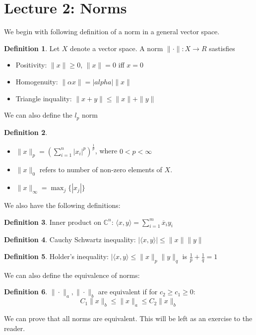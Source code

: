 \documentclass[11pt]{article}
\theoremstyle{definition}
\newtheorem{definition}{Definition}[section]
\newcommand{\C}{\mathbb{C}}
\begin{document}
\section{Lecture 2: Norms}
We begin with following definition of a norm in a general vector space. 
\begin{definition}
  Let $X$ denote a vector space. A norm $\| \cdot \| : X \to R$ sastisfies
  \begin{itemize}
    \item Positivity: $\| x\| \geq 0$, $\| x \| = 0$ iff $x = 0$
    \item Homogenuity: $\| \alpha x \| = |alpha| \| x \|$ 
    \item Triangle inquality: $\| x + y \| \leq \| x \| + \| y \|$
  \end{itemize}
\end{definition}
We can also define the $l_p$ norm
\begin{definition}
  \begin{itemize}
    \item $\| x\|_p = \left( \sum_{i = 1}^{n} |x_i|^p \right)^\frac{1}{p}$, where $0 < p < \infty$
    \item $\|x \|_0$ refers to number of non-zero elements of $X$. 
    \item $\| x \|_\infty = \max_j \{ |x_j| \}$
  \end{itemize}
\end{definition}
We also have the following definitions: 
\begin{definition}
  Inner product on $\C^n$: $\langle x, y \rangle = \sum_{i = 1}^{m} \overline{x}_i y_i$
\end{definition}
\begin{definition}
  Cauchy Schwartz inequality: $| \langle x, y \rangle | \leq \|x \| \|y \|$
\end{definition}

\begin{definition}
  Holder's inequality: $| \langle x, y \rangle \leq \|x\|_p \|y\|_q$ is $\frac{1}{p} + \frac{1}{q} = 1$
\end{definition}
We can also define the equivalence of norms:
\begin{definition}
  $\| \cdot \|_a, \| \cdot \|_b$ are equivalent if for $c_2 \geq c_1 \geq 0$:
  \[
  C_1 \|x \|_b \leq \|x \|_a \leq C_2 \|x\|_b
  \]
\end{definition}
We can prove that all norms are equivalent. This will be left as an exercise to the reader. 
\end{document}
